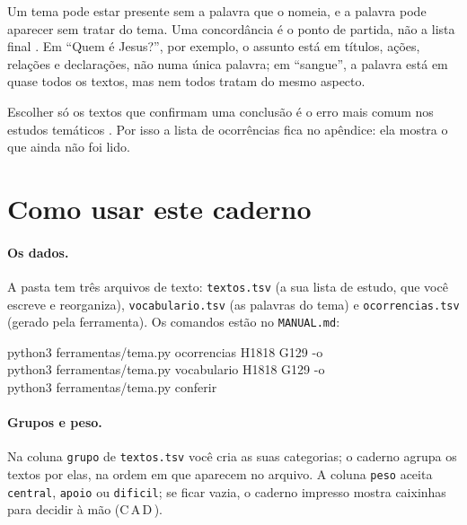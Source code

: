 \begin{alerta}
Um tema pode estar presente sem a palavra que o nomeia, e a palavra pode
aparecer sem tratar do tema. Uma concordância é o ponto de partida, não a
lista final \parencite{barr1961, silva1994}. Em \enquote{Quem é Jesus?}, por
exemplo, o assunto está em títulos, ações, relações e declarações, não numa
única palavra; em \enquote{sangue}, a palavra está em quase todos os textos,
mas nem todos tratam do mesmo aspecto.
\end{alerta}

\begin{alerta}
Escolher só os textos que confirmam uma conclusão é o erro mais comum nos
estudos temáticos \parencite{carson1996}. Por isso a lista de ocorrências fica
no apêndice: ela mostra o que ainda não foi lido.
\end{alerta}

\section{Como usar este caderno}

\paragraph{Os dados.} A pasta \texttt{\temaDados} tem três arquivos de texto:
\texttt{textos.tsv} (a sua lista de estudo, que você escreve e reorganiza),
\texttt{vocabulario.tsv} (as palavras do tema) e \texttt{ocorrencias.tsv}
(gerado pela ferramenta). Os comandos estão no \texttt{MANUAL.md}:

\begin{nota}[Ferramentas]
\small\ttfamily
python3 ferramentas/tema.py ocorrencias H1818 G129 -o \temaDados\\
python3 ferramentas/tema.py vocabulario H1818 G129 -o \temaDados\\
python3 ferramentas/tema.py conferir \temaDados
\end{nota}

\paragraph{Grupos e peso.} Na coluna \texttt{grupo} de \texttt{textos.tsv}
você cria as suas categorias; o caderno agrupa os textos por elas, na ordem
em que aparecem no arquivo. A coluna \texttt{peso} aceita
\texttt{central}, \texttt{apoio} ou \texttt{dificil}; se ficar vazia, o caderno
impresso mostra caixinhas para decidir à mão
({\sffamily\tiny\color{suave}C\,\EBcaixa\;A\,\EBcaixa\;D\,\EBcaixa}).

